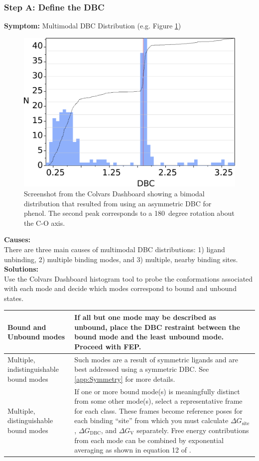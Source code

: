 \documentclass[9pt,tutorial]{Styling/livecoms}
\begin{document}
\subsubsection{Step A: Define the DBC}
\noindent\textbf{Symptom:}  Multimodal DBC Distribution (e.g. Figure \ref{fig:bimodalDBC})\\
\begin{figure}[!htb]
    \centering
    \includegraphics[width=0.9\linewidth]{Figures/recropped_bimodal.png}
    \caption{Screenshot from the Colvars Dashboard showing a bimodal distribution that resulted from using an asymmetric DBC for phenol. The second peak corresponds to a 180~degree rotation about the C-O axis.}
    \label{fig:bimodalDBC}
\end{figure}
\noindent\textbf{Causes:}\\
There are three main causes of multimodal DBC distributions: 1) ligand unbinding, 2) multiple binding modes, and 3) multiple, nearby binding sites.\\ 
\textbf{Solutions:}\\
Use the Colvars Dashboard histogram tool to probe the conformations associated with each mode and decide which modes correspond to bound and unbound states. \\
\begin{tabular}{|p{3cm}|p{5cm}|}
    \hline
    \center Bound and Unbound modes & If all but one mode may be described as unbound, place the DBC restraint between the bound mode and the least unbound mode. Proceed with FEP. \\\hline
    \center Multiple, indistinguishable bound modes & Such modes are a result of symmetric ligands and are best addressed using a symmetric DBC. See \ref{app:Symmetry} for more details.\\\hline
    \center Multiple, distinguishable bound modes & If one or more bound mode(s) is meaningfully distinct from some other mode(s), select a representative frame for each class. These frames become reference poses for each binding ``site'' from which you must calculate $\Delta G_\mathrm{site}$, $\Delta G_\mathrm{DBC}$, and $\Delta G_\mathrm{V}$ separately. Free energy contributions from each mode can be combined by exponential averaging as shown in equation 12 of \cite{Mobley2006}. \\\hline
\end{tabular}
\end{document}
